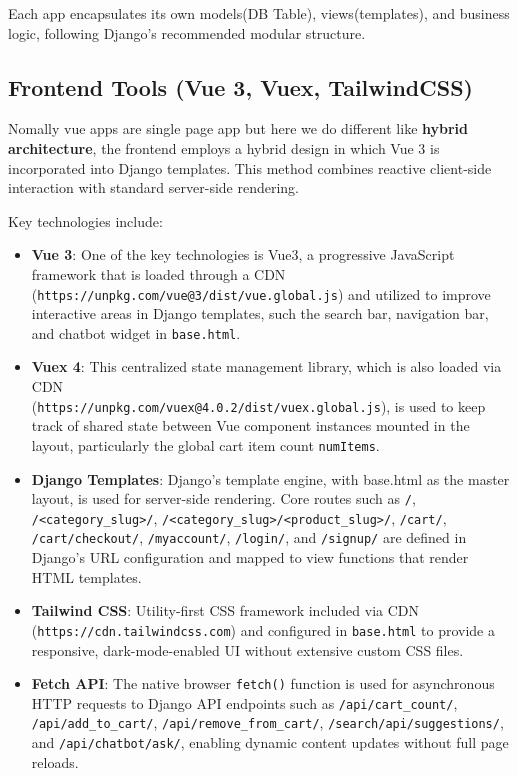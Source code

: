 Each app encapsulates its own models(DB Table), views(templates), and business logic, following Django’s recommended modular structure.

\subsection{Frontend Tools (Vue 3, Vuex, TailwindCSS)}
Nomally vue apps are single page app but here we do different like \textbf{hybrid architecture}, the frontend employs a hybrid design in which Vue 3 is incorporated into Django templates. This method combines reactive client-side interaction with standard server-side rendering.



Key technologies include:
\begin{itemize}
  \item \textbf{Vue 3}: One of the key technologies is Vue3, a progressive JavaScript framework that is loaded through a CDN \\(\texttt{https://unpkg.com/vue@3/dist/vue.global.js}) and utilized to improve interactive areas in Django templates, such the search bar, navigation bar, and chatbot widget in \texttt{base.html}.
  \item \textbf{Vuex 4}: This centralized state management library, which is also loaded via CDN \\ (\texttt{https://unpkg.com/vuex@4.0.2/dist/vuex.global.js}), is used to keep track of shared state between Vue component instances mounted in the layout, particularly the global cart item count \texttt{numItems}.
  \item \textbf{Django Templates}: Django's template engine, with base.html as the master layout, is used for server-side rendering. Core routes such as \texttt{/}, \texttt{/<category\_slug>/}, \texttt{/<category\_slug>/<product\_slug>/}, \texttt{/cart/}, \texttt{/cart/checkout/}, \texttt{/myaccount/}, \texttt{/login/}, and \texttt{/signup/} are defined in Django’s URL configuration and mapped to view functions that render HTML templates.
  \item \textbf{Tailwind CSS}: Utility-first CSS framework included via CDN \\ (\texttt{https://cdn.tailwindcss.com}) and configured in \texttt{base.html} to provide a responsive, dark-mode-enabled UI without extensive custom CSS files.
  \item \textbf{Fetch API}: The native browser \texttt{fetch()} function is used for asynchronous HTTP requests to Django API endpoints such as \texttt{/api/cart\_count/},  \\\texttt{/api/add\_to\_cart/}, \texttt{/api/remove\_from\_cart/}, \texttt{/search/api/suggestions/}, and \texttt{/api/chatbot/ask/}, enabling dynamic content updates without full page reloads.
\end{itemize}

